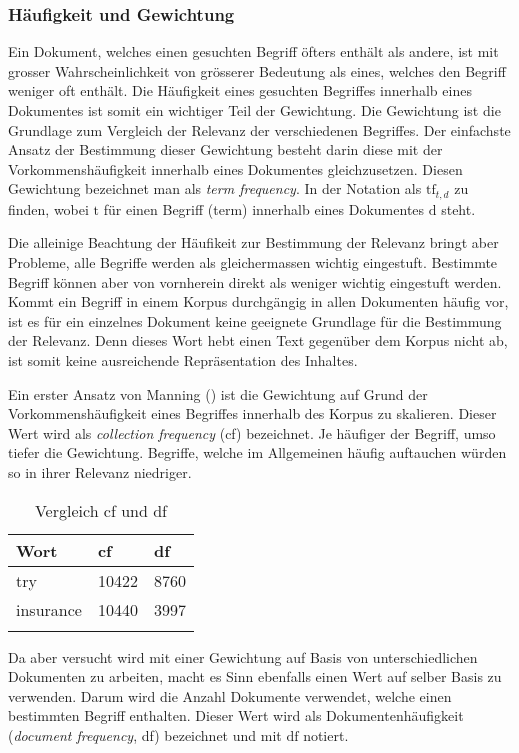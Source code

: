 \subsubsection{Häufigkeit und Gewichtung}\label{gewichtung}

Ein Dokument, welches einen gesuchten Begriff öfters enthält als andere, ist mit grosser Wahrscheinlichkeit von grösserer Bedeutung als eines, welches den Begriff weniger oft enthält. Die Häufigkeit eines gesuchten Begriffes innerhalb eines Dokumentes ist somit ein wichtiger Teil der Gewichtung. Die Gewichtung ist die Grundlage zum Vergleich der Relevanz der verschiedenen Begriffes. Der einfachste Ansatz der Bestimmung dieser Gewichtung besteht darin diese mit der Vorkommenshäufigkeit innerhalb eines Dokumentes gleichzusetzen. Diesen Gewichtung bezeichnet man als \textit{term frequency}. In der Notation als $\text{tf}_{t,d}$ zu finden, wobei $\text{t}$ für einen Begriff (term) innerhalb eines Dokumentes $\text{d}$ steht.

Die alleinige Beachtung der Häufikeit zur Bestimmung der Relevanz bringt aber Probleme, alle Begriffe werden als gleichermassen wichtig eingestuft. Bestimmte Begriff können aber von vornherein direkt als weniger wichtig eingestuft werden. Kommt ein Begriff in einem Korpus durchgängig in allen Dokumenten häufig vor, ist es für ein einzelnes Dokument keine geeignete Grundlage für die Bestimmung der Relevanz. Denn dieses Wort hebt einen Text gegenüber dem Korpus nicht ab, ist somit keine ausreichende Repräsentation des Inhaltes.

Ein erster Ansatz von Manning (\cite{manning2008introduction}) ist die Gewichtung auf Grund der Vorkommens\-häufigkeit eines Begriffes innerhalb des Korpus zu skalieren. Dieser Wert wird als \textit{collection frequency} (cf) bezeichnet. Je häuf\-iger der Begriff, umso tiefer die Gewichtung. Begriffe, welche im Allgemeinen häufig auftauchen würden so in ihrer Relevanz niedriger. 

\begin{longtable}{|p{2cm}| p{1cm} | p{1cm}|}
  \hline
    Wort & cf & df \\\hline
    try & 10422 & 8760 \\\hline
    insurance & 10440 & 3997 \\\hline
    \caption{Vergleich cf und df \protect\footnotemark
    }
  \label{tab:vergleich-cf-df}
\end{longtable}


Da aber versucht wird mit einer Gewichtung auf Basis von unterschiedlichen Dokumenten zu arbeiten, macht es Sinn ebenfalls einen Wert auf selber Basis zu verwenden. Darum wird die Anzahl Dokumente verwendet, welche einen bestimmten Begriff enthalten. Dieser Wert wird als Dokumentenhäufigkeit (\textit{document frequency}, df) bezeichnet und mit $\text{df}$ notiert.

